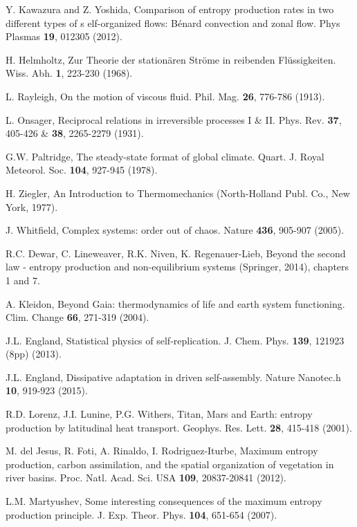 \documentclass[aps,prl,reprint,singlecolumn,superscriptaddress]{revtex4}
\begin{document}
{\begin{thebibliography}{}
 Y. Kawazura and Z. Yoshida, {Comparison of entropy production rates in two different types of s
elf-organized flows: Bénard convection and zonal flow.} Phys Plasmas {\bf 19}, 012305 (2012).

 H. Helmholtz, {Zur Theorie der station\"aren Str\"ome in reibenden Fl\"ussigkeiten.} Wiss. Abh. {\bf 1}, 223-230 (1968).

 L. Rayleigh, {On the motion of viscous fluid.} Phil. Mag. {\bf 26}, 776-786 (1913).

 L. Onsager, {Reciprocal relations in irreversible processes I \& II.} Phys. Rev. {\bf 37}, 405-426 \& {\bf 38}, 2265-2279 (1931).

 G.W. Paltridge, {The steady-state format of global climate.} Quart. J. Royal Meteorol. Soc. {\bf 104}, 927-945 (1978).

 H. Ziegler, {An Introduction to Thermomechanics} (North-Holland Publ. Co., New York, 1977).

 J. Whitfield, Complex systems: order out of chaos. Nature {\bf 436}, 905-907 (2005).

 R.C. Dewar, C. Lineweaver, R.K. Niven, K. Regenauer-Lieb, {Beyond the second law - entropy production and non-equilibrium systems} (Springer, 2014), 
chapters 1 and 7.

 A. Kleidon, Beyond Gaia: thermodynamics of life and earth system functioning. Clim. Change {\bf 66}, 271-319 (2004).

 J.L. England, Statistical physics of self-replication. J. Chem. Phys. {\bf 139}, 121923 (8pp) (2013).

 J.L. England, Dissipative adaptation in driven self-assembly. Nature Nanotec.h {\bf 10}, 919-923 (2015). 

 R.D. Lorenz, J.I. Lunine, P.G. Withers, Titan, Mars and Earth: entropy production by latitudinal heat transport. 
Geophys. Res. Lett. {\bf 28}, 415-418 (2001).

 M. del Jesus, R. Foti, A. Rinaldo, I. Rodriguez-Iturbe, Maximum entropy production, carbon assimilation, and the spatial organization of vegetation in river basins.
Proc. Natl. Acad. Sci. USA {\bf 109}, 20837-20841 (2012).

 L.M. Martyushev, {Some interesting consequences of the maximum entropy production principle.} J. Exp. Theor. Phys. {\bf 104}, 651-654 (2007).


\end{thebibliography}}
\end{document}
